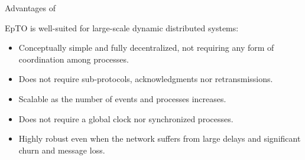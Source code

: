 
\begin{frame}{Advantages of \EPTO}
  
        EpTO is well-suited for large-scale dynamic distributed systems: 
  \begin{itemize}
 \item Conceptually simple and fully decentralized, not requiring any form of coordination among processes. 

\item Does not require sub-protocols, acknowledgments nor retransmissions.

\item Scalable as the number of events and processes increases.

\item Does not require a global clock nor synchronized processes.

\item Highly robust even when the network suffers from large delays and significant churn and message loss.
\end{itemize}

\end{frame}


